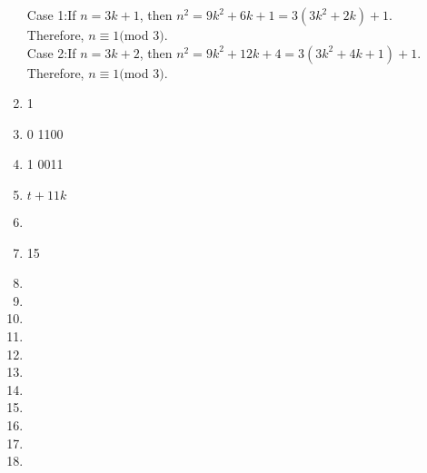 \documentclass[11pt]{article}
\begin{document}
\begin{enumerate}
Case 1:If $n = 3k + 1$, then $n^2 = 9k^2 + 6k + 1 = 3(3k^2 + 2k) + 1$. \\Therefore, $n \equiv 1($mod $ 3) $.\\
Case 2:If $n = 3k + 2$, then $n^2 = 9k^2 + 12k + 4 = 3(3k^2 + 4k + 1) + 1$. \\Therefore, $n \equiv 1($mod $ 3) $.
\item 1
\item 0 1100
\item 1 0011
\item $t + 11k$
\item 
\item 15
\item 
\item 
\item 
\item 
\item 
\item 
\item 
\item 
\item 
\item 
\item 

\end{enumerate}
\end{document}
